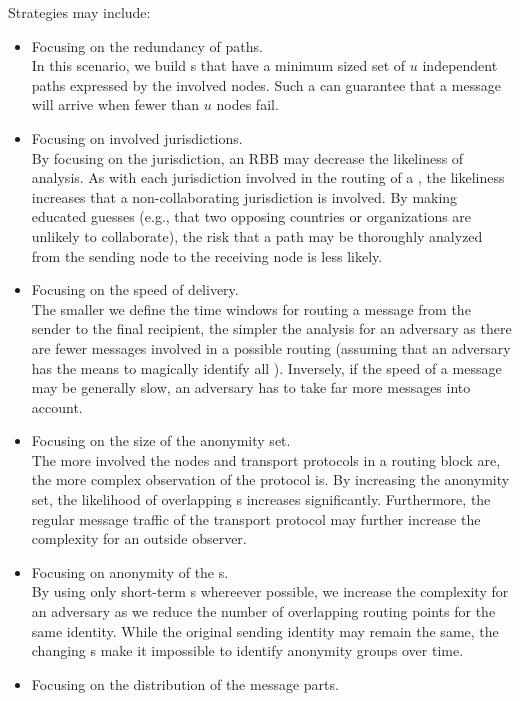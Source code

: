Strategies may include:
\begin{itemize}
	\item Focusing on the redundancy of paths.\\
	In this scenario, we build s that have a minimum sized set of $u$ independent paths expressed by the involved nodes. Such a  can guarantee that a message will arrive when fewer than $u$ nodes fail.
	\item Focusing on involved jurisdictions.\\
	By focusing on the jurisdiction, an RBB may decrease the likeliness of analysis. As with each jurisdiction involved in the routing of a \VortexMessage{}, the likeliness increases that a non-collaborating jurisdiction is involved. By making educated guesses (e.g., that two opposing countries or organizations are unlikely to collaborate), the risk that a path may be thoroughly analyzed from the sending node to the receiving node is less likely.
	\item Focusing on the speed of delivery.\\
	The smaller we define the time windows for routing a message from the sender to the final recipient, the simpler the analysis for an adversary as there are fewer messages involved in a possible routing (assuming that an adversary has the means to magically identify all \VortexMessages). Inversely, if the speed of a message may be generally slow, an adversary has to take far more messages into account.
	\item Focusing on the size of the anonymity set.\\
	The more involved the nodes and transport protocols in a routing block are, the more complex observation of the protocol is. By increasing the anonymity set, the likelihood of overlapping s increases significantly. Furthermore, the regular message traffic of the transport protocol may further increase the complexity for an outside observer.
	\item Focusing on anonymity of the s.\\
	By using only short-term s whereever possible, we increase the complexity for an adversary as we reduce the number of overlapping routing points for the same identity. While the original sending identity may remain the same, the changing s make it impossible to identify anonymity groups over time.
	\item Focusing on the distribution of the message parts.\\

\end{itemize}
